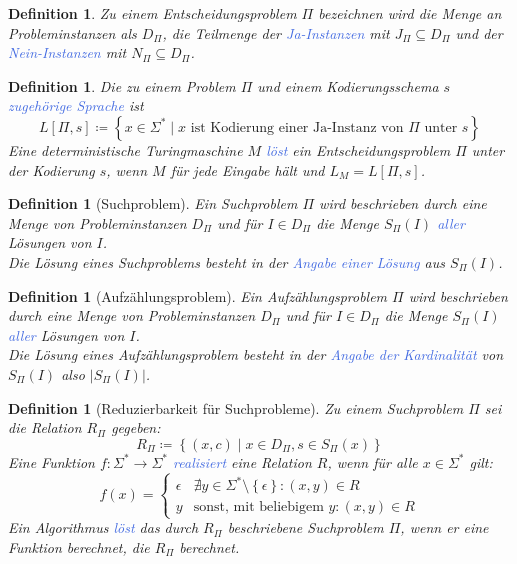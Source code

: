 \documentclass[11pt]{article}
\newcommand{\tcol}[1]{\textcolor{RoyalBlue}{#1}}
\newcommand{\set}[1]{\left\lbrace #1\right\rbrace}
\theoremstyle{break}
\newtheorem{defi}[satz]{Definition}
\begin{document}
\begin{defi}
Zu einem Entscheidungsproblem $\Pi$ bezeichnen wird die Menge an Probleminstanzen als $D_\Pi$, die Teilmenge der \tcol{Ja-Instanzen} mit $J_\Pi\subseteq D_\Pi$ und der \tcol{Nein-Instanzen} mit $N_\Pi\subseteq D_\Pi$.
\end{defi}

\begin{defi}
Die zu einem Problem $\Pi$ und einem Kodierungsschema $s$ \tcol{zugehörige Sprache} ist
\[L[\Pi,s]\coloneqq\set{x\in\Sigma^*\mid x\text{ ist Kodierung einer Ja-Instanz von $\Pi$ unter $s$}}\]
Eine deterministische Turingmaschine $M$ \tcol{löst} ein Entscheidungsproblem $\Pi$ unter der Kodierung $s$, wenn $M$ für jede Eingabe hält und $L_M=L[\Pi,s]$.
\end{defi}

\begin{defi}[Suchproblem]
Ein Suchproblem $\Pi$ wird beschrieben durch eine Menge von Probleminstanzen $D_\Pi$ und für $I\in D_\Pi$ die Menge $S_\Pi(I)$ \tcol{aller} Lösungen von $I$.\\
Die Lösung eines Suchproblems besteht in der \tcol{Angabe einer Lösung} aus $S_\Pi(I)$.
\end{defi}

\begin{defi}[Aufzählungsproblem]
Ein Aufzählungsproblem $\Pi$ wird beschrieben durch eine Menge von Probleminstanzen $D_\Pi$ und für $I\in D_\Pi$ die Menge $S_\Pi(I)$ \tcol{aller} Lösungen von $I$.\\
Die Lösung eines Aufzählungsproblem besteht in der \tcol{Angabe der Kardinalität} von $S_\Pi(I)$ also $|S_\Pi(I)|$.
\end{defi}

\begin{defi}[Reduzierbarkeit für Suchprobleme]
Zu einem Suchproblem $\Pi$ sei die Relation $R_\Pi$ gegeben:
\[R_\Pi\coloneqq\set{(x,c)\mid x\in D_\Pi,s\in S_\Pi(x)}\]
Eine Funktion $f\colon\Sigma^*\to\Sigma^*$ \tcol{realisiert} eine Relation $R$, wenn für alle $x\in\Sigma^*$ gilt:
\[f(x)= \begin{cases}
		\epsilon & \nexists y\in\Sigma^*\setminus\set{\epsilon}\colon (x,y)\in R \\
		y & \text{sonst, mit beliebigem } y\colon (x,y)\in R
		\end{cases}
\]
Ein Algorithmus \tcol{löst} das durch $R_\Pi$ beschriebene Suchproblem $\Pi$, wenn er eine Funktion berechnet, die $R_\Pi$ berechnet.
\end{defi}
\end{document}
